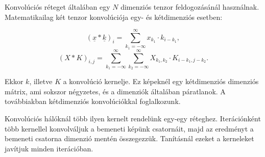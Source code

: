 






Konvolúciós réteget általában egy $ N $ dimenziós tenzor feldogozásánál használnak.
Matematikailag két tenzor konvolúciója egy- és kétdimenziós esetben:



\[  (\underline{x}*\underline{k})_{i} =  \sum\limits_{k_1=-\infty}^{\infty} x_{k_1} \cdot k_{i-k_1} , \]
\[  (X*K)_{i, j} =  
\sum\limits_{k_1=-\infty}^{\infty}  
\sum\limits_{k_2=-\infty}^{\infty} 
X_{k_1, k_2} \cdot K_{i-k_1, j-k_2} . \]



Ekkor $ k $, illetve $ K $ a konvolúció kernelje. Ez képeknél egy kétdimenziós dimenziós mátrix, ami sokszor négyzetes, és a dimenziók általában páratlanok. A továbbiakban kétdimenziós konvolúciókkal foglalkozunk.


Konvolúciós hálóknál több ilyen kernelt rendelünk egy-egy réteghez.
Iterációnként több kernellel konvolváljuk a bemeneti képünk csatornáit, majd az eredményt a bemeneti csatorna dimenzió mentén összegezzük.
Tanításnál ezeket a kerneleket javítjuk minden iterációban.


